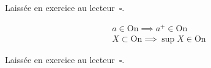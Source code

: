 \begin{explanation}
    Laissée en exercice au lecteur \(\,\square\).
\end{explanation}

\begin{theorem}[Le sup]
    \begin{eqnarray*}
        a \in \mathrm{On} \implies a^{+} \in \mathrm{On}\\
        X \subset \mathrm{On} \implies \sup X \in \mathrm{On}
    \end{eqnarray*}
\end{theorem}

\begin{explanation}
    Laissée en exercice au lecteur \(\,\square\).
\end{explanation}

